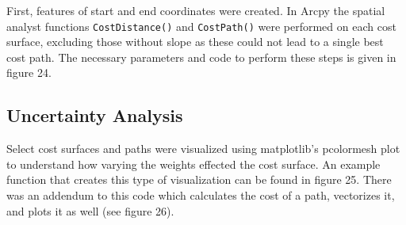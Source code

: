 \documentclass[article,12pt]{article}
\numberwithin{equation}{section}
\begin{document}
First, features of start and end coordinates were created. In Arcpy the spatial analyst functions \texttt{CostDistance()} and \texttt{CostPath()} were performed on each cost surface, excluding those without slope as these could not lead to a single best cost path. The necessary parameters and code to perform these steps is given in figure 24.

\newpage
\subsection{Uncertainty Analysis}

Select cost surfaces and paths were visualized using matplotlib's pcolormesh plot to understand how varying the weights effected the cost surface. An example function that creates this type of visualization can be found in figure 25. There was an addendum to this code which calculates the cost of a path, vectorizes it, and plots it as well (see figure 26). 


\newpage
\end{document}
